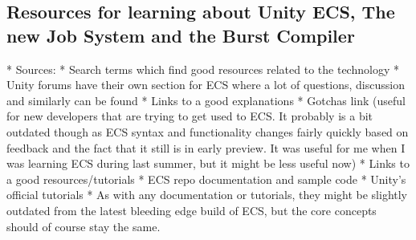\subsection{Resources for learning about Unity ECS, The new Job System and the Burst Compiler}
* Sources:
  * Search terms which find good resources related to the technology
     * Unity forums have their own section for ECS where a lot of questions, discussion and similarly can be found
  * Links to a good explanations
     * Gotchas link (useful for new developers that are trying to get used to ECS. It probably is a bit outdated though as ECS syntax and functionality changes fairly quickly based on feedback and the fact that it still is in early preview. It was useful for me when I was learning ECS during last summer, but it might be less useful now)
  * Links to a good resources/tutorials
     * ECS repo documentation and sample code
     * Unity's official tutorials
     * As with any documentation or tutorials, they might be slightly outdated from the latest bleeding edge build of ECS, but the core concepts should of course stay the same. 